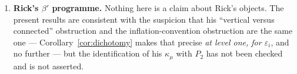 \documentclass[11pt]{article}
\theoremstyle{plain}
\theoremstyle{definition}
\newcommand{\Ce}{C_e^{(1)}}
\begin{document}
\begin{enumerate}
shows $\Ce\ne0$ for every $e\ge2$ in every normalisation.  The brief's hoped-for
demotion of $\Ce$ to a convention artifact does not survive; what survives is
the identification of the bar involution with transposition on this operator.
\item \textbf{Rick's $\beta'$ programme.}  Nothing here is a claim about
Rick's objects.  The present results are consistent with the suspicion that
his ``vertical versus connected'' obstruction and the inflation-convention
obstruction are the same one --- Corollary~\ref{cor:dichotomy} makes that
precise \emph{at level one, for $\varepsilon_i$}, and no further --- but the
identification of his $\kappa_\mu$ with $P_2$ has not been checked and is not
asserted.
\end{enumerate}
\end{document}
